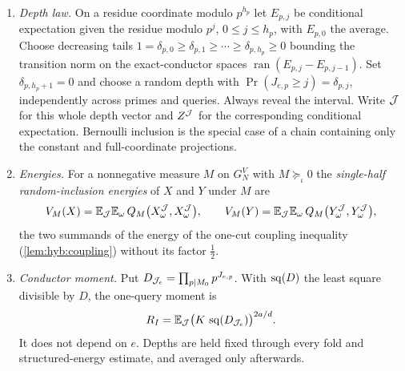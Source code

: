 \begin{definition}
\begin{enumerate}[label=(\alph*)]
 \[
  I_{\kappa,\mathcal S}=\E_\omega\,Q_\kappa\Bigl(X_\omega,
  \Bigl(\bigotimes_{e\in\mathcal S}T_e\bigotimes_{e\notin\mathcal S}P_e\,Y
  \Bigr)_\omega\Bigr),\qquad
  J_\kappa=\E_\omega\,Q_\kappa\bigl(X_\omega,(\mathcal TY)_\omega\bigr),\qquad
  \mathcal T=\bigotimes_e(2P_e-T_e),
 \]
 the operators acting on the index variable of $Y_\omega$; they commute with
 the field labels. $J_\kappa$ is the \emph{signed index form}.
\item\emph{Depth law.} On a residue coordinate modulo $p^{h_p}$ let
 $E_{p,j}$ be conditional expectation given the residue modulo $p^j$,
 $0\le j\le h_p$, with $E_{p,0}$ the average. Choose decreasing tails
 $1=\delta_{p,0}\ge\delta_{p,1}\ge\cdots\ge\delta_{p,h_p}\ge0$
 bounding the transition norm on the exact-conductor spaces
 $\operatorname{ran}(E_{p,j}-E_{p,j-1})$. Set
 $\delta_{p,h_p+1}=0$ and choose a random depth with
 $\Pr(J_{e,p}\ge j)=\delta_{p,j}$, independently across primes and
 queries. Always reveal the interval. Write $\mathcal J$ for this whole
 depth vector and $Z^{\mathcal J}$ for the corresponding conditional
 expectation. Bernoulli inclusion is the special case of a chain
 containing only the constant and full-coordinate projections.
\item\emph{Energies.} For a nonnegative measure $M$ on $G_N^V$ with
 $M\succeq_\iota0$ the \emph{single-half random-inclusion energies} of $X$ and
 $Y$ under $M$ are
 \[
  V_M(X)=\mathbb E_{\mathcal J}\mathbb E_\omega\,Q_M\bigl(X^{\mathcal J}_\omega,X^{\mathcal J}_\omega\bigr),\qquad
  V_M(Y)=\mathbb E_{\mathcal J}\mathbb E_\omega\,Q_M\bigl(Y^{\mathcal J}_\omega,Y^{\mathcal J}_\omega\bigr),
 \]
 the two summands of the energy of the one-cut coupling inequality
 (\cref{lem:hyb:coupling}) without its factor $\frac12$.
\item\emph{Conductor moment.} Put
 $D_{\mathcal J_e}=\prod_{p\mid M_0}p^{J_{e,p}}$. With $\operatorname{sq}(D)$ the least
 square divisible by $D$, the one-query moment is
 \[
  R_I=\mathbb E_{\mathcal J}\bigl(K\,\operatorname{sq}(D_{\mathcal J_e})\bigr)^{2a/d}.
 \]
 It does not depend on $e$. Depths are held fixed through every fold
 and structured-energy estimate, and averaged only afterwards.
\end{enumerate}
\end{definition}

